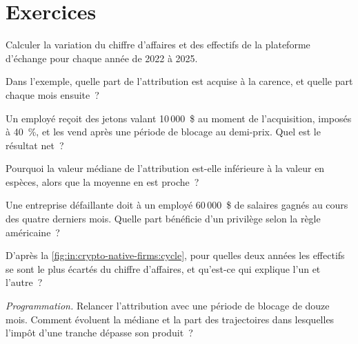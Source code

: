 \section{Exercices}

\begin{exercise}[$\star$]\label{exo:in:crypto-native-firms:1}
Calculer la variation du chiffre d'affaires et des effectifs de la plateforme d'échange pour chaque année de 2022 à 2025.
\end{exercise}

\begin{exercise}[$\star$]\label{exo:in:crypto-native-firms:2}
Dans l'exemple, quelle part de l'attribution est acquise à la carence, et quelle part chaque mois ensuite~?
\end{exercise}

\begin{exercise}[$\star$]\label{exo:in:crypto-native-firms:3}
Un employé reçoit des jetons valant 10\,000~\$ au moment de l'acquisition, imposés à 40~\%, et les vend après une période de blocage au demi-prix.
Quel est le résultat net~?
\end{exercise}

\begin{exercise}[$\star\star$]\label{exo:in:crypto-native-firms:4}
Pourquoi la valeur médiane de l'attribution est-elle inférieure à la valeur en espèces, alors que la moyenne en est proche~?
\end{exercise}

\begin{exercise}[$\star\star$]\label{exo:in:crypto-native-firms:5}
Une entreprise défaillante doit à un employé 60\,000~\$ de salaires gagnés au cours des quatre derniers mois. Quelle part bénéficie d'un privilège selon la règle américaine~?
\end{exercise}

\begin{exercise}[$\star\star$]\label{exo:in:crypto-native-firms:6}
D'après la \cref{fig:in:crypto-native-firms:cycle}, pour quelles deux années les effectifs se sont le plus écartés
du chiffre d'affaires, et qu'est-ce qui explique l'un et l'autre~?
\end{exercise}

\begin{exercise}[$\star\star\star$]\label{exo:in:crypto-native-firms:7}
\emph{Programmation.} Relancer l'attribution avec une période de blocage de douze mois. Comment évoluent la médiane et la part des trajectoires dans lesquelles
l'impôt d'une tranche dépasse son produit~?
\end{exercise}

